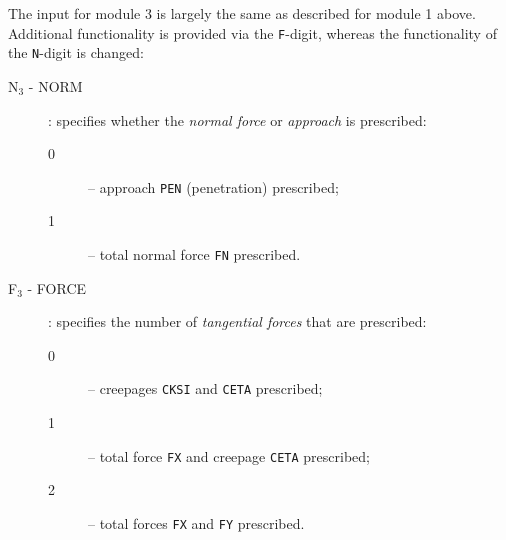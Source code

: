\documentclass[12pt]{report}
\newcommand{\var}[1]{\mbox{\tt #1}}
\begin{document}
The input for module 3 is largely the same as described for module 1 above.
Additional functionality is provided via the {\tt F}-digit, whereas the
functionality of the {\tt N}-digit is changed:

\begin{description}
\item[N$_3$ - NORM]  \label{n3-digit} : specifies whether the {\em normal
force\/} or {\em approach\/} is prescribed:
\begin{description}
\item[0] -- approach \var{PEN} (penetration) prescribed;
\item[1] -- total normal force \var{FN} prescribed.
\end{description}

\item[F$_3$ - FORCE] \label{f3-digit} : specifies the number of {\em
        tangential forces\/} that are prescribed:
\begin{description}
\item[0] -- creepages \var{CKSI} and \var{CETA} prescribed;
\item[1] -- total force \var{FX} and creepage \var{CETA} prescribed;
\item[2] -- total forces \var{FX} and \var{FY} prescribed.
\end{description}
\end{description}
\end{document}
